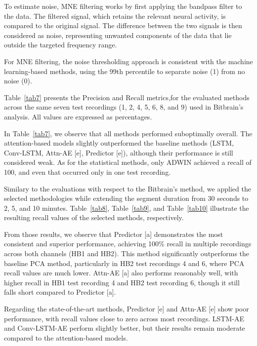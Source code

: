 To estimate noise, MNE filtering works by first applying the bandpass filter to the data. The filtered signal, which retains the relevant neural activity, is compared to the original signal. The difference between the two signals is then considered as noise, representing unwanted components of the data that lie outside the targeted frequency range.

For MNE filtering, the noise thresholding approach is consistent with the machine learning-based methods, using the 99th percentile to separate noise (1) from no noise (0).

Table~\ref{tab7} presents the Precision and Recall metrics,for the evaluated methods across the same seven test recordings (1, 2, 4, 5, 6, 8, and 9) used in Bitbrain's analysis. All values are expressed as percentages.

In Table~\ref{tab7}, we observe that all methods performed suboptimally overall. The attention-based models slightly outperformed the baseline methods (LSTM, Conv-LSTM, Attn-AE [e], Predictor [e]), although their performance is still considered weak. As for the statistical methods, only ADWIN achieved a recall of 100, and even that occurred only in one test recording.

Similary to the evaluations with respect to the Bitbrain's method, we applied the selected methodologies while extending the segment duration from 30 seconds to 2, 5, and 10 minutes. Table~\ref{tab8}, Table~\ref{tab9}, and Table~\ref{tab10} illustrate the resulting recall values of the selected methods, respectively.

From those results, we observe that Predictor [a] demonstrates the most consistent and superior performance, achieving 100\% recall in multiple recordings across both channels (HB1 and HB2). This method significantly outperforms the baseline PCA method, particularly in HB2 test recordings 4 and 6, where PCA recall values are much lower. Attn-AE [a] also performs reasonably well, with higher recall in HB1 test recording 4 and HB2 test recording 6, though it still falls short compared to Predictor [a].

Regarding the state-of-the-art methods, Predictor [e] and Attn-AE [e] show poor performance, with recall values close to zero across most recordings. LSTM-AE and Conv-LSTM-AE perform slightly better, but their results remain moderate compared to the attention-based models.

